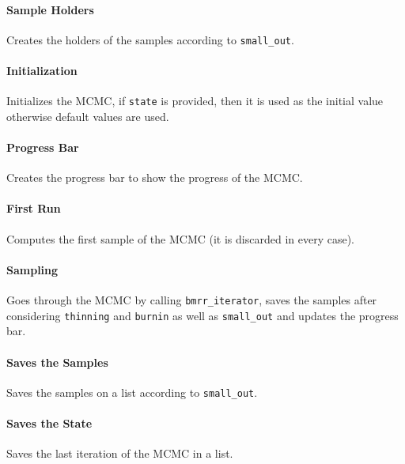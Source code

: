 \documentclass[
]{article}
\begin{document}
\paragraph{Sample Holders}\label{sample-holders}

Creates the holders of the samples according to \texttt{small\_out}.

\paragraph{Initialization}\label{initialization}

Initializes the MCMC, if \texttt{state} is provided, then it is used as the initial
value otherwise default values are used.

\paragraph{Progress Bar}\label{progress-bar}

Creates the progress bar to show the progress of the MCMC.

\paragraph{First Run}\label{first-run}

Computes the first sample of the MCMC (it is discarded in every case).

\paragraph{Sampling}\label{sampling}

Goes through the MCMC by calling \texttt{bmrr\_iterator}, saves the samples after
considering \texttt{thinning} and \texttt{burnin} as well as \texttt{small\_out} and updates the
progress bar.

\paragraph{Saves the Samples}\label{saves-the-samples}

Saves the samples on a list according to \texttt{small\_out}.

\paragraph{Saves the State}\label{saves-the-state}

Saves the last iteration of the MCMC in a list.
\end{document}
